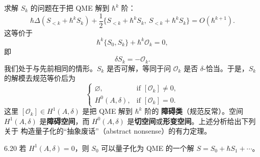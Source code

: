 
求解 $S_k$ 的问题在于把 QME 解到 $\hbar^k$ 阶：
\[
  \hbar\Delta(S_{<k}+\hbar^k S_k)
  + \frac{1}{2}\{S_{<k}+\hbar^k S_k,\ S_{<k}+\hbar^k S_k\}
  = O(\hbar^{k+1}).
\]
这等价于
\[
  \hbar^k\{S_0,S_k\} + \hbar^k\mathcal{O}_k = 0,
\]
即
\[
  \delta S_k = -\mathcal{O}_k.
\]
我们处于与先前相同的情形。$S_k$ 是否可解，等同于问 $\mathcal{O}_k$ 是否
$\delta$-恰当。于是，$S_k$ 的解模去规范等价后为
\[
  \begin{cases}
    \varnothing, & \text{if } [\mathcal{O}_k]\neq 0,\\
    H^0(A,\delta), & \text{if } [\mathcal{O}_k] = 0.
  \end{cases}
\]
这里 $[\mathcal{O}_k]\in H^1(A,\delta)$ 是把 QME 解到 $\hbar^k$ 阶的
\textbf{障碍类}（规范反常）。空间 $H^1(A,\delta)$ 是\textbf{障碍空间}，而
$H^0(A,\delta)$ 是\textbf{切空间}或\textbf{形变空间}。上述分析给出下列关于
构造量子化的“抽象废话”（abstract nonsense）的有力定理。

\begin{wthm}{6.20}
  若 $H^1(A,\delta) = 0$，则 $S_0$ 可以量子化为 QME 的一个解
  $S = S_0 + \hbar S_1 + \cdots$。
\end{wthm}

